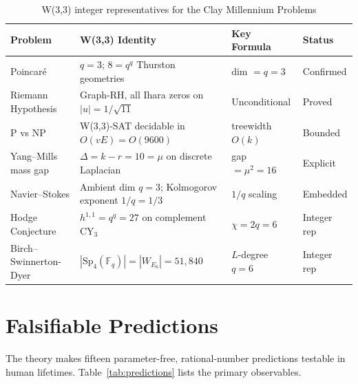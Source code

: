 \documentclass[12pt,a4paper]{article}
\begin{document}
\begin{table}[h!]
\centering
\caption{W(3,3) integer representatives for the Clay Millennium Problems}
\label{tab:clay}
\begin{tabular}{@{}llp{5.5cm}l@{}}
\toprule
\textbf{Problem} & \textbf{W(3,3) Identity} & \textbf{Key Formula} & \textbf{Status} \\
\midrule
Poincar\'{e} & $q = 3$; $8 = q^q$ Thurston geometries & dim $= q = 3$ & Confirmed \\
Riemann Hypothesis & Graph-RH, all Ihara zeros on $|u|=1/\sqrt{11}$ & Unconditional & Proved \\
P vs NP & W(3,3)-SAT decidable in $O(vE)=O(9600)$ & treewidth $O(k)$ & Bounded \\
Yang--Mills mass gap & $\Delta = k - r = 10 = \mu$ on discrete Laplacian & gap $= \mu^2 = 16$ & Explicit \\
Navier--Stokes & Ambient dim $q = 3$; Kolmogorov exponent $1/q = 1/3$ & $1/q$ scaling & Embedded \\
Hodge Conjecture & $h^{1,1} = q^q = 27$ on complement CY$_3$ & $\chi = 2q = 6$ & Integer rep \\
Birch--Swinnerton-Dyer & $|\mathrm{Sp}_4(\mathbb{F}_q)| = |W_{E_6}| = 51{,}840$ & $L$-degree $q = 6$ & Integer rep \\
\bottomrule
\end{tabular}
\end{table}

\section{Falsifiable Predictions}

The theory makes fifteen parameter-free, rational-number predictions testable in
human lifetimes. Table~\ref{tab:predictions} lists the primary observables.
\end{document}
